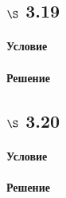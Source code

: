 \documentclass[a4paper,12pt]{article}
\begin{document}
\subsection*{$\S$ 3.19}
\paragraph*{Условие}
\paragraph*{Решение}

\subsection*{$\S$ 3.20}
\paragraph*{Условие}
\paragraph*{Решение}
\end{document}
